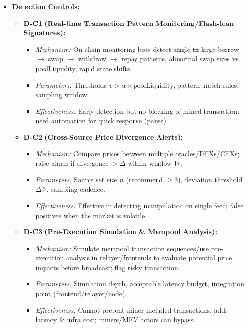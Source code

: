 \begin{itemize}
    \item \textbf{Detection Controls:}
    \begin{itemize}
        \item \textbf{D-C1 (Real-time Transaction Pattern Monitoring/Flash-loan Signatures):}
            \begin{itemize}
                \item \textit{Mechanism:} On-chain monitoring bots detect single-tx large borrow $\rightarrow$ swap $\rightarrow$ withdraw $\rightarrow$ repay patterns, abnormal swap sizes vs poolLiquidity, rapid state shifts.
                \item \textit{Parameters:} Thresholds $v > \alpha \times \text{poolLiquidity}$, pattern match rules, sampling window.
                \item \textit{Effectiveness:} Early detection but no blocking of mined transaction; need automation for quick response (pause).
            \end{itemize}
        \item \textbf{D-C2 (Cross-Source Price Divergence Alerts):}
            \begin{itemize}
                \item \textit{Mechanism:} Compare prices between multiple oracles/DEXs/CEXs; raise alarm if divergence $> \Delta$ within window $W$.
                \item \textit{Parameters:} Source set size $n$ (recommend $\geq 3$), deviation threshold $\Delta\%$, sampling cadence.
                \item \textit{Effectiveness:} Effective in detecting manipulation on single feed; false positives when the market is volatile.
            \end{itemize}
        \item \textbf{D-C3 (Pre-Execution Simulation \& Mempool Analysis):}
            \begin{itemize}
                \item \textit{Mechanism:} Simulate mempool transaction sequences/use pre-execution analysis in relayer/frontends to evaluate potential price impacts before broadcast; flag risky transaction.
                \item \textit{Parameters:} Simulation depth, acceptable latency budget, integration point (frontend/relayer/node).
                \item \textit{Effectiveness:} Cannot prevent miner-included transactions; adds latency \& infra cost; miners/MEV actors can bypass.
            \end{itemize}
    \end{itemize}
\end{itemize}


